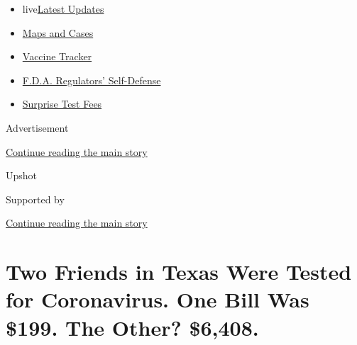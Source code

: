 \begin{itemize}
\tightlist
\item
  live\href{https://www.nytimes3xbfgragh.onion/2020/09/11/world/covid-19-coronavirus.html?name=styln-coronavirus-national\&region=TOP_BANNER\&block=storyline_menu_recirc\&action=click\&pgtype=Article\&impression_id=c8706081-f4b4-11ea-819f-ab65e79fd32a\&variant=undefined}{Latest
  Updates}
\item
  \href{https://www.nytimes3xbfgragh.onion/interactive/2020/us/coronavirus-us-cases.html?name=styln-coronavirus-national\&region=TOP_BANNER\&block=storyline_menu_recirc\&action=click\&pgtype=Article\&impression_id=c8706082-f4b4-11ea-819f-ab65e79fd32a\&variant=undefined}{Maps
  and Cases}
\item
  \href{https://www.nytimes3xbfgragh.onion/interactive/2020/science/coronavirus-vaccine-tracker.html?name=styln-coronavirus-national\&region=TOP_BANNER\&block=storyline_menu_recirc\&action=click\&pgtype=Article\&impression_id=c8706083-f4b4-11ea-819f-ab65e79fd32a\&variant=undefined}{Vaccine
  Tracker}
\item
  \href{https://www.nytimes3xbfgragh.onion/2020/09/10/us/politics/fda-coronavirus-vaccine.html?name=styln-coronavirus-national\&region=TOP_BANNER\&block=storyline_menu_recirc\&action=click\&pgtype=Article\&impression_id=c8706084-f4b4-11ea-819f-ab65e79fd32a\&variant=undefined}{F.D.A.
  Regulators' Self-Defense}
\item
  \href{https://www.nytimes3xbfgragh.onion/2020/09/09/upshot/coronavirus-surprise-test-fees.html?name=styln-coronavirus-national\&region=TOP_BANNER\&block=storyline_menu_recirc\&action=click\&pgtype=Article\&impression_id=c8708790-f4b4-11ea-819f-ab65e79fd32a\&variant=undefined}{Surprise
  Test Fees}
\end{itemize}

Advertisement

\protect\hyperlink{after-top}{Continue reading the main story}

Upshot

Supported by

\protect\hyperlink{after-sponsor}{Continue reading the main story}

\hypertarget{two-friends-in-texas-were-tested-for-coronavirus-one-bill-was-199-the-other-6408}{%
\section{Two Friends in Texas Were Tested for Coronavirus. One Bill Was
\$199. The Other?
\$6,408.}\label{two-friends-in-texas-were-tested-for-coronavirus-one-bill-was-199-the-other-6408}}

